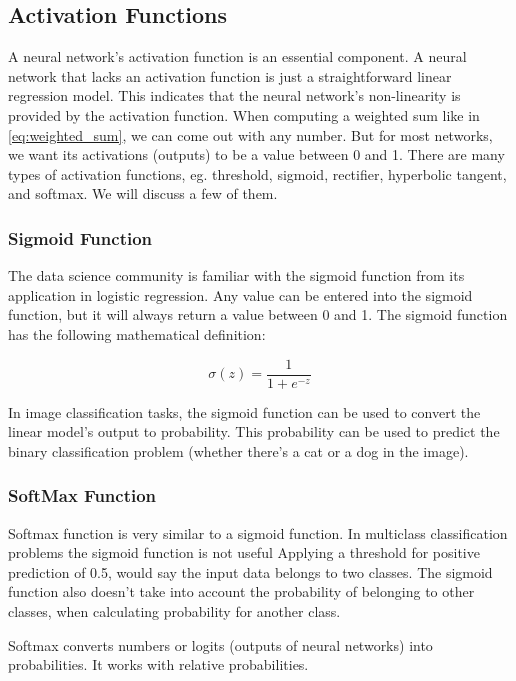 \subsection*{Activation Functions}
A neural network's activation function is an essential component. A neural network that lacks an activation function is just a straightforward linear regression model. This indicates that the neural network's non-linearity is provided by the activation function. When computing a weighted sum like in \ref{eq:weighted_sum}, we can come out with any number. But for most networks, we want its activations (outputs) to be a value between 0 and 1.\newline
There are many types of activation functions, eg. threshold, sigmoid, rectifier, hyperbolic tangent, and softmax. We will discuss a few of them.

\subsubsection*{Sigmoid Function}
The data science community is familiar with the sigmoid function from its application in logistic regression. Any value can be entered into the sigmoid function, but it will always return a value between 0 and 1. The sigmoid function has the following mathematical definition:

\begin{equation}
	\sigma(z) = \frac{1} {1 + e^{-z}}
\end{equation}

In image classification tasks, the sigmoid function can be used to convert the linear model's output to probability. This probability can be used to predict the binary classification problem (whether there's a cat or a dog in the image). 


\subsubsection*{SoftMax Function
}
Softmax function is very similar to a sigmoid function. In multiclass classification problems the sigmoid function is not useful Applying a threshold for positive prediction of 0.5, would say the input data belongs to two classes. The sigmoid function also doesn't take into account the probability of belonging to other classes, when calculating probability for another class. 

Softmax converts numbers or logits (outputs of neural networks) into probabilities. It works with relative probabilities.


